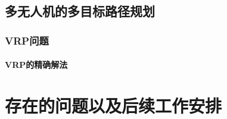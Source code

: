\documentclass[UTF8,a4paper]{ctexart}
\begin{document}
\subsection{多无人机的多目标路径规划}\label{sec:vrp}
\subsubsection{VRP问题}
\paragraph{VRP的精确解法~\cite{qureshi2010exact}}















\section{存在的问题以及后续工作安排}















\newpage





















\end{document}
